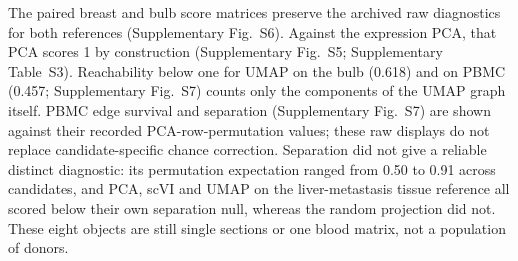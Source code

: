 \documentclass[11pt]{article}
\begin{document}
\FloatBarrier

The paired breast and bulb score matrices preserve the archived raw diagnostics for both references (Supplementary Fig.~S6). Against the expression PCA, that PCA scores 1 by construction (Supplementary Fig.~S5; Supplementary Table~S3). Reachability below one for UMAP on the bulb (0.618) and on PBMC (0.457; Supplementary Fig.~S7) counts only the components of the UMAP graph itself. PBMC edge survival and separation (Supplementary Fig.~S7) are shown against their recorded PCA-row-permutation values; these raw displays do not replace candidate-specific chance correction. Separation did not give a reliable distinct diagnostic: its permutation expectation ranged from 0.50 to 0.91 across candidates, and PCA, scVI and UMAP on the liver-metastasis tissue reference all scored below their own separation null, whereas the random projection did not. These eight objects are still single sections or one blood matrix, not a population of donors.



\FloatBarrier




\end{document}

